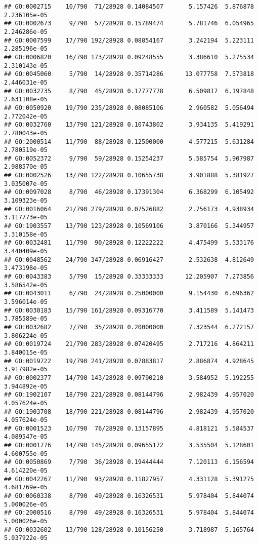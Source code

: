 \documentclass[
]{article}
\begin{document}
\begin{verbatim}
## GO:0002715    10/790  71/28928 0.14084507       5.157426  5.876878 2.236105e-05
## GO:0002673     9/790  57/28928 0.15789474       5.781746  6.054965 2.246286e-05
## GO:0007599    17/790 192/28928 0.08854167       3.242194  5.223111 2.285196e-05
## GO:0006820    16/790 173/28928 0.09248555       3.386610  5.275534 2.310143e-05
## GO:0045060     5/790  14/28928 0.35714286      13.077758  7.573818 2.446031e-05
## GO:0032735     8/790  45/28928 0.17777778       6.509817  6.197848 2.631108e-05
## GO:0050920    19/790 235/28928 0.08085106       2.960582  5.056494 2.772042e-05
## GO:0032760    13/790 121/28928 0.10743802       3.934135  5.419291 2.780043e-05
## GO:2000514    11/790  88/28928 0.12500000       4.577215  5.631284 2.780519e-05
## GO:0052372     9/790  59/28928 0.15254237       5.585754  5.907987 2.988570e-05
## GO:0002526    13/790 122/28928 0.10655738       3.901888  5.381927 3.035007e-05
## GO:0097028     8/790  46/28928 0.17391304       6.368299  6.105492 3.109323e-05
## GO:0016064    21/790 279/28928 0.07526882       2.756173  4.938934 3.117773e-05
## GO:1903557    13/790 123/28928 0.10569106       3.870166  5.344957 3.310158e-05
## GO:0032481    11/790  90/28928 0.12222222       4.475499  5.533176 3.440409e-05
## GO:0048562    24/790 347/28928 0.06916427       2.532638  4.812649 3.473198e-05
## GO:0043383     5/790  15/28928 0.33333333      12.205907  7.273856 3.586542e-05
## GO:0043011     6/790  24/28928 0.25000000       9.154430  6.696362 3.596014e-05
## GO:0030183    15/790 161/28928 0.09316770       3.411589  5.141473 3.785589e-05
## GO:0032682     7/790  35/28928 0.20000000       7.323544  6.272157 3.806224e-05
## GO:0019724    21/790 283/28928 0.07420495       2.717216  4.864211 3.840015e-05
## GO:0019722    19/790 241/28928 0.07883817       2.886874  4.928645 3.917982e-05
## GO:0002377    14/790 143/28928 0.09790210       3.584952  5.192255 3.944892e-05
## GO:1902107    18/790 221/28928 0.08144796       2.982439  4.957020 4.057624e-05
## GO:1903708    18/790 221/28928 0.08144796       2.982439  4.957020 4.057624e-05
## GO:0001523    10/790  76/28928 0.13157895       4.818121  5.584537 4.089547e-05
## GO:0001776    14/790 145/28928 0.09655172       3.535504  5.128601 4.600755e-05
## GO:0050869     7/790  36/28928 0.19444444       7.120113  6.156594 4.614220e-05
## GO:0042267    11/790  93/28928 0.11827957       4.331128  5.391275 4.681769e-05
## GO:0060338     8/790  49/28928 0.16326531       5.978404  5.844074 5.000026e-05
## GO:2000516     8/790  49/28928 0.16326531       5.978404  5.844074 5.000026e-05
## GO:0032602    13/790 128/28928 0.10156250       3.718987  5.165764 5.037922e-05

\end{verbatim}
\end{document}
